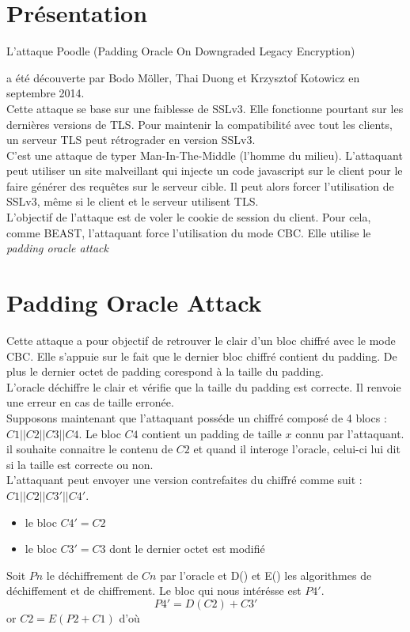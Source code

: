 
\chapter{Présentation}
\label{chapter:poodlePres}

L'attaque Poodle (Padding Oracle On Downgraded Legacy Encryption)

a été découverte par Bodo Möller, Thai Duong et 
Krzysztof Kotowicz\cite{article:ssl-poodle} en septembre 2014.\\

Cette attaque se base sur une faiblesse de SSLv3.
Elle fonctionne pourtant sur les dernières versions de TLS.
Pour maintenir la compatibilité avec tout les clients, un
serveur TLS peut rétrograder en version SSLv3.\\

C'est une attaque de typer Man-In-The-Middle (l'homme du milieu).
L'attaquant peut utiliser un site malveillant qui injecte un
code javascript sur le client pour le faire générer des requêtes
sur le serveur cible. Il peut alors forcer l'utilisation de 
SSLv3, même si le client et le serveur utilisent TLS.\\

L'objectif de l'attaque est de voler le cookie de session 
du client. Pour cela, comme BEAST, l'attaquant force 
l'utilisation du mode CBC. Elle utilise le \emph{padding oracle attack }

\chapter{Padding Oracle Attack}
\label{chapter:POA}

Cette attaque a pour objectif de retrouver le clair d'un bloc chiffré 
avec le mode CBC. Elle s'appuie sur le fait que le dernier bloc chiffré
contient du padding. De plus le dernier octet de padding corespond à la
taille du padding.\\

L'oracle  déchiffre le clair et vérifie que la taille du padding est correcte. 
Il renvoie une erreur en cas de taille erronée.\\

Supposons maintenant que l'attaquant posséde un chiffré composé de 4 blocs :
$C1||C2||C3||C4$. Le bloc $C4$ contient un padding de taille $x$ connu par l'attaquant.
il souhaite connaitre le contenu de $C2$ et quand il interoge l'oracle, celui-ci lui dit
si la taille est correcte ou non.\\
L'attaquant peut envoyer une version contrefaites du chiffré comme suit :
$C1||C2||C3'||C4'$.\\
\begin{itemize}
\item le bloc $C4'=C2$
\item le bloc $C3'= C3$ dont le dernier octet est modifié
\end{itemize}
Soit $Pn$ le déchiffrement de $Cn$ par l'oracle et D() et E() les algorithmes
de déchiffement et de chiffrement. 
Le bloc qui nous intérésse est $P4'$.
\[P4' = D(C2) + C3'\]
or $C2 = E(P2 + C1)$ d'où

